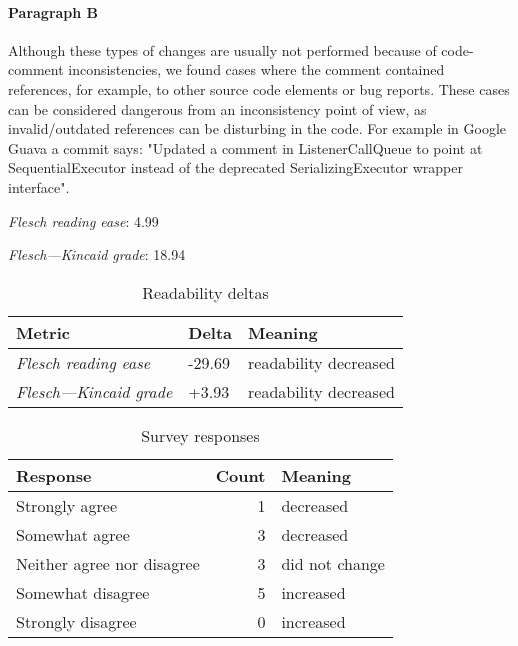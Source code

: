 \paragraph{Paragraph B}
Although these types of changes are usually not performed because of code-comment inconsistencies, we found cases where the comment contained references, for example, to other source code elements or bug reports. These cases can be considered dangerous from an inconsistency point of view, as invalid/outdated references can be disturbing in the code. For example in Google Guava a commit says: "Updated a comment in ListenerCallQueue to point at SequentialExecutor instead of the deprecated SerializingExecutor wrapper interface".\par\medskip
\emph{Flesch reading ease}: 4.99\par
\emph{Flesch---Kincaid grade}: 18.94

\bigskip\begin{table}[!h]
\centering
\begin{tabular}{lll}
\toprule
               \textbf{Metric} & \textbf{Delta} &       \textbf{Meaning} \\
\midrule
    \emph{Flesch reading ease} &         -29.69 &  readability decreased \\
 \emph{Flesch---Kincaid grade} &          +3.93 &  readability decreased \\
\bottomrule
\end{tabular}
\caption*{Readability deltas}\end{table}

\begin{table}[!h]
\centering
\begin{tabular}{lrl}
\toprule
          \textbf{Response} &  \textbf{Count} & \textbf{Meaning} \\
\midrule
             Strongly agree &               1 &        decreased \\
             Somewhat agree &               3 &        decreased \\
 Neither agree nor disagree &               3 &   did not change \\
          Somewhat disagree &               5 &        increased \\
          Strongly disagree &               0 &        increased \\
\bottomrule
\end{tabular}
\caption*{Survey responses}\end{table}


\newpage
